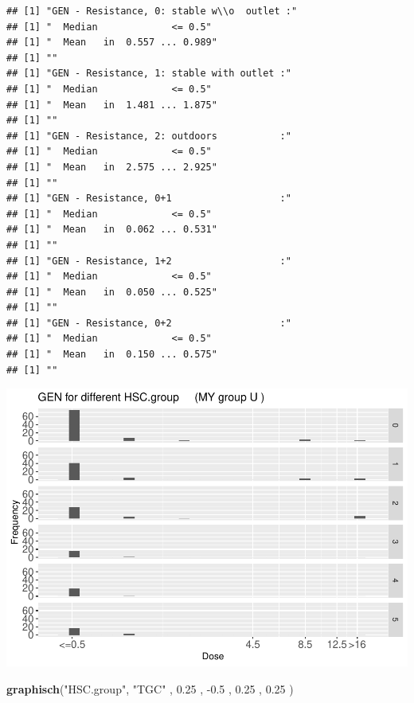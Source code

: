 \documentclass[
]{article}
\newenvironment{Shaded}{\begin{snugshade}}{\end{snugshade}}
\newcommand{\FloatTok}[1]{\textcolor[rgb]{0.00,0.00,0.81}{#1}}
\newcommand{\KeywordTok}[1]{\textcolor[rgb]{0.13,0.29,0.53}{\textbf{#1}}}
\newcommand{\NormalTok}[1]{#1}
\newcommand{\StringTok}[1]{\textcolor[rgb]{0.31,0.60,0.02}{#1}}
\begin{document}
\begin{verbatim}
## [1] "GEN - Resistance, 0: stable w\\o  outlet :"
## [1] "  Median             <= 0.5"
## [1] "  Mean   in  0.557 ... 0.989"
## [1] ""
## [1] "GEN - Resistance, 1: stable with outlet :"
## [1] "  Median             <= 0.5"
## [1] "  Mean   in  1.481 ... 1.875"
## [1] ""
## [1] "GEN - Resistance, 2: outdoors           :"
## [1] "  Median             <= 0.5"
## [1] "  Mean   in  2.575 ... 2.925"
## [1] ""
## [1] "GEN - Resistance, 0+1                   :"
## [1] "  Median             <= 0.5"
## [1] "  Mean   in  0.062 ... 0.531"
## [1] ""
## [1] "GEN - Resistance, 1+2                   :"
## [1] "  Median             <= 0.5"
## [1] "  Mean   in  0.050 ... 0.525"
## [1] ""
## [1] "GEN - Resistance, 0+2                   :"
## [1] "  Median             <= 0.5"
## [1] "  Mean   in  0.150 ... 0.575"
## [1] ""
\end{verbatim}

\includegraphics{Verteilungen_files/figure-latex/unnamed-chunk-48-1.pdf}

\begin{Shaded}
\begin{Highlighting}[]
   \KeywordTok{graphisch}\NormalTok{(}\StringTok{"HSC.group"}\NormalTok{, }\StringTok{"TGC"}\NormalTok{ , }\FloatTok{0.25}\NormalTok{ ,  }\FloatTok{-0.5}\NormalTok{ ,   }\FloatTok{0.25}\NormalTok{ ,   }\FloatTok{0.25}\NormalTok{ )  }
\end{Highlighting}
\end{Shaded}
\end{document}
